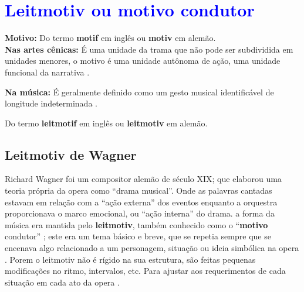 \newpage

\section{\textcolor{blue}{Leitmotiv ou motivo condutor}}

\begin{tcbinformation} 
\textbf{Motivo:}
Do termo \textbf{motif} em inglês ou  \textbf{motiv}  em alemão.\\

\textbf{Nas artes cênicas:}
É uma unidade da trama que não pode ser subdividida em unidades menores,
o motivo é uma unidade autônoma de ação, uma unidade funcional da narrativa \cite[pp. 221]{pavis1998dictionary}.

\textbf{Na música:}
É geralmente definido como um gesto musical identificável de longitude indeterminada \cite[pp. 123]{powrie2006changing}.

\end{tcbinformation}


\begin{notation}
Do termo \textbf{leitmotif} em inglês ou  \textbf{leitmotiv}  em alemão.
\end{notation}



\subsection{Leitmotiv de Wagner}

Richard Wagner foi um compositor alemão de século XIX; 
que elaborou uma teoria própria da opera como ``drama musical''.
Onde as palavras cantadas estavam em relação com a ``ação externa'' dos eventos
enquanto a orquestra proporcionava o marco emocional, ou ``ação interna'' do drama.
a forma da música era mantida pelo \textbf{leitmotiv}, 
também conhecido como o ``\textbf{motivo} condutor'' \cite[pp. 229-230]{holst1998abc};
este era um tema básico e breve, 
que se repetia sempre que se encenava algo relacionado a um personagem, 
situação ou ideia simbólica na opera \cite[pp. 229-230]{holst1998abc} \cite[pp. 465-466]{apel1969harvard}.
Porem o leitmotiv não é rígido na sua estrutura, são feitas pequenas modificações no ritmo, intervalos, etc.
Para ajustar aos requerimentos de cada situação em cada ato da opera \cite[pp. 466]{apel1969harvard}.

